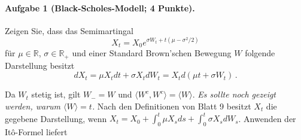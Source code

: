\documentclass{article}
\begin{document}
\paragraph{Aufgabe 1 \textnormal{(Black-Scholes-Modell; 4 Punkte)}.}
Zeigen Sie, dass das Semimartingal
\[X_t=X_0e^{\sigma W_t+t(\mu-\sigma^2/2)}\]
für $\mu\in\mathbb{R}$, $\sigma\in\mathbb{R}_+$ und einer Standard Brown'schen Bewegung $W$ folgende Darstellung besitzt
\[dX_t=\mu X_tdt+\sigma X_tdW_t=X_td(\mu t+\sigma W_t)\,.\]

Da $W_t$ stetig ist, gilt $W_-=W$ und $\langle W^c,W^c\rangle=\langle W\rangle$.
\emph{Es sollte noch gezeigt werden, warum $\langle W\rangle=t$.}
Nach den Definitionen von Blatt 9 besitzt $X_t$ die gegebene Darstellung, wenn $X_t=X_0+\int_0^t\mu X_sds+\int_0^t\sigma X_sdW_s$.
Anwenden der Itô-Formel liefert
\end{document}
